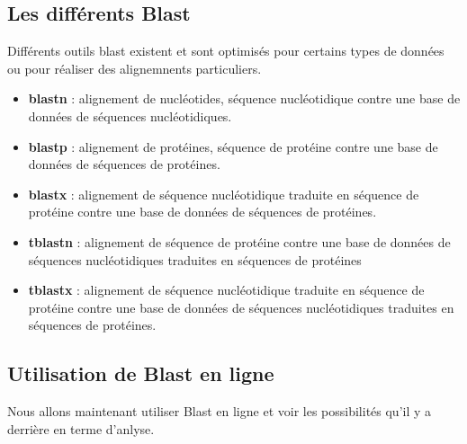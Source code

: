 \documentclass{article}
\begin{document}
\subsection{Les différents Blast}

Différents outils blast existent et sont optimisés pour certains types de données ou pour réaliser des alignemnents particuliers.

\begin{itemize}
\item \textbf{blastn} : alignement de nucléotides, séquence nucléotidique contre une base de données de séquences nucléotidiques.

\item \textbf{blastp} : alignement de protéines, séquence de protéine contre une base de données de séquences de protéines.

\item \textbf{blastx} : alignement de séquence nucléotidique traduite en séquence de protéine contre une base de données de séquences de protéines.

\item \textbf{tblastn} : alignement de séquence de protéine contre une base de données de séquences nucléotidiques traduites en séquences de protéines

\item \textbf{tblastx} : alignement de séquence nucléotidique traduite en séquence de protéine contre une base de données de séquences nucléotidiques traduites en séquences de protéines.
\end{itemize}

\subsection{Utilisation de Blast en ligne}

Nous allons maintenant utiliser Blast en ligne et voir les possibilités qu'il y a derrière en terme d'anlyse.
\end{document}
